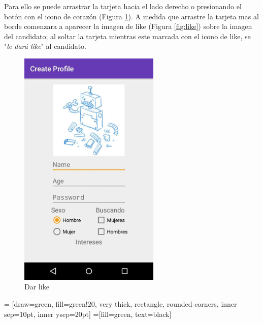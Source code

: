 \documentclass[10pt,letterpaper,extrafontsizes]{memoir}
\begin{document}
Para ello se puede arrastrar la tarjeta hacia el lado derecho o presionando el botón con el icono de corazón (Figura \ref{fig:dlike}). A medida que arrastre la tarjeta mas al borde comenzara a aparecer la imagen de like (Figura \ref{fig:like}) sobre la imagen del candidato; al soltar la tarjeta mientras este marcada con el icono de like, se "\emph{le dará like}" al candidato.

\begin{figure}[H]
    \centering
\includegraphics[width=0.6\textwidth]{graficos/capturas/i}
    \caption{Dar like}
    \label{fig:dlike}
\end{figure}

\begin{center}
 = [draw=green, fill=green!20, very thick,
    rectangle, rounded corners, inner sep=10pt, inner ysep=20pt]
 =[fill=green, text=black]
\end{center}
%
\end{document}
